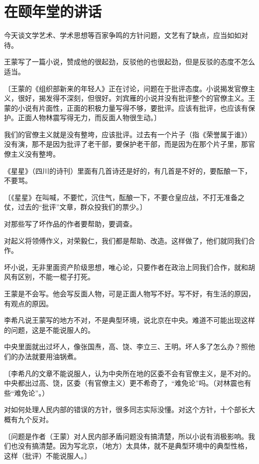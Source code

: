 \section[在颐年堂的讲话（一九五七年二月十六日）]{在颐年堂的讲话}


今天谈文学艺术、学术思想等百家争鸣的方针问题，文艺有了缺点，应当如如对待。

王蒙写了一篇小说，赞成他的很起劲，反驳他的也很起劲，但是反驳的态度不怎么适当。

〔王蒙的《组织部新来的年轻人》正在讨论，问题在于批评态度。小说揭发官僚主义，很好，揭发得不深刻，但很好。刘宾雁的小说并没有批评整个的官僚主义。王蒙的小说有片面性，正面的积极力量写得不够，要批评。应该有批评，也应该有保护。正面人物林震写得无力，而反面人物很生动。〕

我们的官僚主义就是没有整垮，应该批评。过去有一个片子（指《荣誉属于谁》）没有演，那不是因为批评了老干部，要保护老干部，而是因为在那个片子里，那官僚主义没有整垮。

《星星》（四川的诗刊）里面有几首诗还是好的，有几首是不好的，要酝酿一下，不要骂。

〔《星星》在叫喊，不要忙，沉住气，酝酿一下，不要仓皇应战，不打无准备之仗，过去的“批评”文章，群众投我们的票少。〕

对那些写了坏作品的作者要帮助，要调查。

对起义将领傅作义，对荣毅仁，我们都是帮助、改造。这样做了，他们就同我们合作。

坏小说，无非里面资产阶级思想，唯心论，只要作者在政治上同我们合作，就和胡风有区别，不能一棍子打死。

王蒙是不会写。他会写反面人物，可是正面人物写不好。写不好，有生活的原因，有观点的原因。

李希凡说王蒙写的地方不对，不是典型环境，说北京在中央。难道不可能出现这样的问题，这是不能说服人的。

中央里面就出过坏人，像张国焘，高、饶、李立三、王明。坏人多了怎么办？照他们的办法就要用油锅煮。

〔李希凡的文章不能说服人，认为中央所在地的区委不会有官僚主义，是不对的。中央都出过高、饶，区委（有官僚主义）更不希奇了，“难免论”吗。（对林震也有些“难免论”。）

对如何处理人民内部的错误的方针，很多同志实际没懂。对这个方针，十个部长大概有九个反对。

〔问题是作者（王蒙）对人民内部矛盾问题没有搞清楚，所以小说有消极影响。我们也没有搞清楚。因为写北京，（地方）太具体，就不是典型环境中的典型性格，这样（批评）不能说服人。〕

